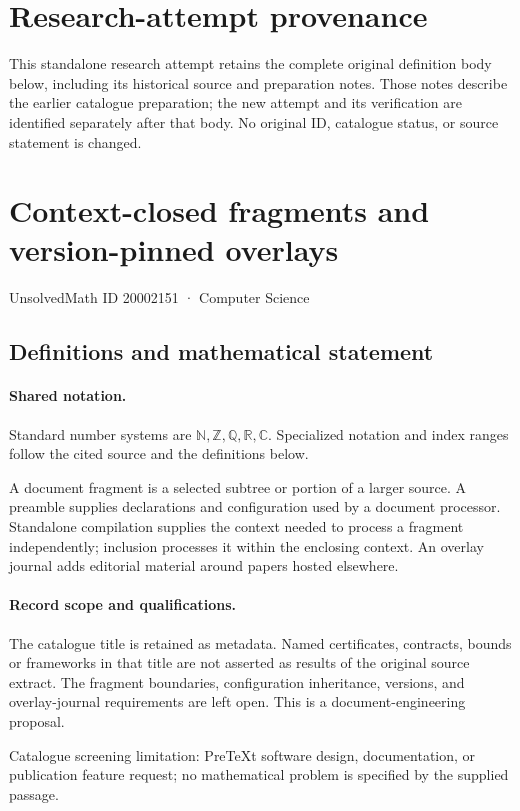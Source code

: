 \documentclass[11pt]{article}
\begin{document}
\section*{Research-attempt provenance}
This standalone research attempt retains the complete original definition body below,
including its historical source and preparation notes. Those notes describe the
earlier catalogue preparation; the new attempt and its verification are identified
separately after that body. No original ID, catalogue status, or source statement is changed.

\section{Context-closed fragments and version-pinned overlays}\label{20002151}
{\small UnsolvedMath ID 20002151 · Computer Science}
\subsection{Definitions and mathematical statement}

\paragraph{Shared notation.}Standard number systems are $\mathbb N,\mathbb Z,\mathbb Q,\mathbb R,\mathbb C$. Specialized notation and index ranges follow the cited source and the definitions below.


A document fragment is a selected subtree or portion of a larger source. A preamble supplies declarations and configuration used by a document processor. Standalone compilation supplies the context needed to process a fragment independently; inclusion processes it within the enclosing context. An overlay journal adds editorial material around papers hosted elsewhere.
\paragraph{Record scope and qualifications.}
The catalogue title is retained as metadata. Named certificates, contracts, bounds or frameworks in that title are not asserted as results of the original source extract.
The fragment boundaries, configuration inheritance, versions, and overlay-journal requirements are left open. This is a document-engineering proposal.

Catalogue screening limitation: PreTeXt software design, documentation, or publication feature request; no mathematical problem is specified by the supplied passage.
\end{document}
